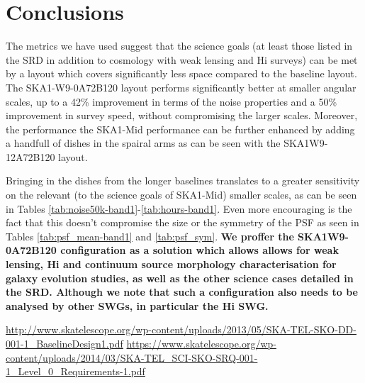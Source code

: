 \documentclass[sfheadings,a4paper,times,9pt,floats,floatfix]{article}
\begin{document}
\section{Conclusions}\label{sec:conclusion}
The metrics we have used suggest that the science goals (at least those listed in the SRD in addition to cosmology with weak
lensing and H{\sc i} surveys) can be met by a layout which covers significantly less space compared to the baseline layout. The
SKA1-W9-0A72B120 layout performs significantly better at smaller angular scales, up to a 42\% improvement in terms of the noise
properties and a 50\% improvement in survey speed, without compromising the larger scales. Moreover, the performance the
SKA1-Mid performance can be further enhanced by adding a handfull of dishes in the spairal arms as can be seen
with the SKA1W9-12A72B120 layout.

Bringing in the dishes from the longer baselines translates to a greater sensitivity on the relevant (to the
science goals of SKA1-Mid) smaller scales, as can be seen in Tables \ref{tab:noise50k-band1}-\ref{tab:hours-band1}. Even
more encouraging is
the fact that this doesn't compromise the size or the symmetry of the PSF as seen in Tables \ref{tab:psf_mean-band1} and
\ref{tab:psf_sym}. {\bf We proffer the SKA1W9-0A72B120 configuration as a solution which allows allows for weak lensing, H{\sc i}
and continuum source morphology characterisation for galaxy evolution studies, as well as the other science cases detailed in the
SRD. Although we note that such a configuration also needs to be analysed by other SWGs, in particular the H{\sc i} SWG.}

\begin{thebibliography}{99}
  \url{http://www.skatelescope.org/wp-content/uploads/2013/05/SKA-TEL-SKO-DD-001-1_BaselineDesign1.pdf}
  \url{https://www.skatelescope.org/wp-content/uploads/2014/03/SKA-TEL_SCI-SKO-SRQ-001-1_Level_0_Requirements-1.pdf}
\end{thebibliography}
\pagebreak
\appendix
\end{document}
